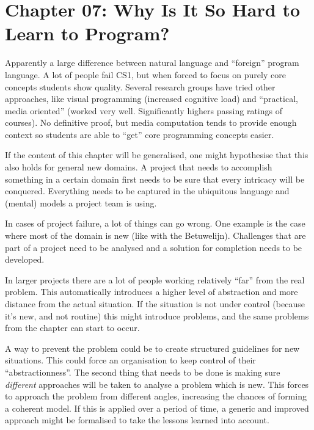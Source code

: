 \documentclass[]{uva-bachelor-thesis}
\title{\course}
\subtitle{\assignment}
\author{\group}
\begin{document}
\maketitle

\setlength{\parskip}{0px}
\tableofcontents
\setlength{\parskip}{.5em}

\clearpage

\chapter{Chapter 07: Why Is It So Hard to Learn to Program?}
Apparently a large difference between natural language and ``foreign'' program language. 
A lot of people fail CS1, but when forced to focus on purely core concepts students show quality. 
Several research groups have tried other approaches, like visual programming (increased cognitive load) and ``practical, media oriented'' (worked very well. Significantly highers passing ratings of courses).
No definitive proof, but media computation tends to provide enough context so students are able to ``get'' core programming concepts easier. 

If the content of this chapter will be generalised, one might hypothesise that this also holds for general new domains. 
A project that needs to accomplish something in a certain domain first needs to be sure that every intricacy will be conquered.
Everything needs to be captured in the ubiquitous language and (mental) models a project team is using.

In cases of project failure, a lot of things can go wrong. 
One example is the case where most of the domain is new (like with the Betuwelijn). 
Challenges that are part of a project need to be analysed and a solution for completion needs to be developed. 

In larger projects there are a lot of people working relatively ``far'' from the real problem. 
This automatically introduces a higher level of abstraction and more distance from the actual situation. 
If the situation is not under control (because it's new, and not routine) this might introduce problems, and the same problems from the chapter can start to occur. 

A way to prevent the problem could be to create structured guidelines for new situations.
This could force an organisation to keep control of their ``abstractionness''. 
The second thing that needs to be done is making sure \emph{different} approaches will be taken to analyse a problem which is new. 
This forces to approach the problem from different angles, increasing the chances of forming a coherent model.
If this is applied over a period of time, a generic and improved approach might be formalised to take the lessons learned into account.
\end{document}
